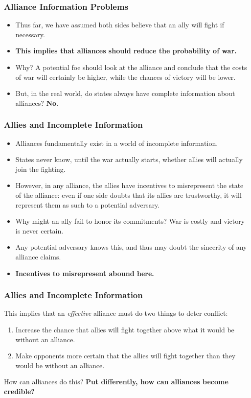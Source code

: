 \documentclass[handout]{beamer}
\begin{document}
\begin{frame} 
\frametitle{\LARGE{Alliance Information Problems}}
	\begin{itemize}
		\item Thus far, we have assumed both sides believe that an ally will fight if necessary. \pause
		\item \textbf{This implies that alliances should reduce the probability of war.} \pause
		\item Why? A potential foe should look at the alliance and conclude that the costs of war will certainly be higher, while the chances of victory will be lower. \pause
		\item But, in the real world, do states always have complete information about alliances? \pause \textbf{No}. 
	\end{itemize}
\end{frame}

\begin{frame} 
	\frametitle{\LARGE{Allies and Incomplete Information}}
	\begin{itemize}
		\item Alliances fundamentally exist in a world of incomplete information. \pause
		\item States never know, until the war actually starts, whether allies will actually join the fighting. \pause
		\item However, in any alliance, the allies have incentives to misrepresent the state of the alliance: even if one side doubts that its allies are trustworthy, it will represent them as such to a potential adversary. \pause
		\item Why might an ally fail to honor its commitments? War is costly and victory is never certain. \pause
		\item Any potential adversary knows this, and thus may doubt the sincerity of any alliance claims.
		\item \textbf{Incentives to misrepresent abound here.}
	\end{itemize}
\end{frame}

\begin{frame} 
	\frametitle{\LARGE{Allies and Incomplete Information}}
This implies that an \textit{effective} alliance must do two things to deter conflict:
\begin{enumerate}
	\item Increase the chance that allies will fight together above what it would be without an alliance. \pause 
	\item Make opponents more certain that the allies will fight together than they would be without an alliance.
\end{enumerate}
How can alliances do this? \textbf{Put differently, how can alliances become credible?}
\end{frame}
\end{document}
